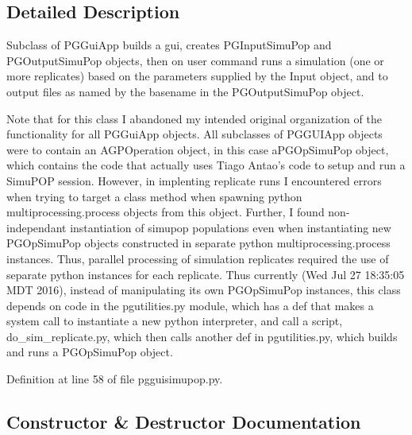 \subsection{Detailed Description}
\begin{DoxyVerb}Subclass of PGGuiApp builds a gui,
creates PGInputSimuPop and PGOutputSimuPop
objects, then on user command runs a simulation 
(one or more replicates) based on the parameters 
supplied by the Input object, and to output files 
as named by the basename in the PGOutputSimuPop object.  

Note that for this class I abandoned my intended original 
organization of the functionality for all  PGGuiApp objects.
All subclasses of PGGUIApp objects were to contain an 
AGPOperation object, in this case aPGOpSimuPop object, 
which contains the code that actually uses Tiago Antao's 
code to setup and run a SimuPOP session.  However, in 
implenting replicate runs I encountered errors when
trying to target a class method when spawning python
multiprocessing.process objects from this object.  Further,
I found non-independant instantiation of simupop populations 
even when instantiating new PGOpSimuPop objects constructed
in separate python multiprocessing.process instances.   
Thus, parallel processing of simulation replicates required 
the use of separate python instances for each replicate. 
Thus currently (Wed Jul 27 18:35:05 MDT 2016),
instead of manipulating its own PGOpSimuPop instances,
this class depends on code in the pgutilities.py
module, which has a def that makes a system call to 
instantiate a new python interpreter, and call a script,
do_sim_replicate.py, which then calls another def in 
pgutilities.py, which builds and runs a PGOpSimuPop object.\end{DoxyVerb}
 

Definition at line 58 of file pgguisimupop.\+py.



\subsection{Constructor \& Destructor Documentation}
